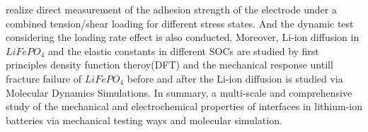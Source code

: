\begin{eabstract}
realize direct measurement of the adhesion strength of the
electrode under a combined tension/shear loading for different
stress states. And the dynamic test considering the loading rate effect is also conducted. Moreover, Li-ion diffusion in $LiFePO_4$ and the elastic constants in different SOCs are studied by first principles density function theroy(DFT) and the mechanical response untill fracture failure of $LiFePO_4$ before and after the Li-ion diffusion is studied via Molecular Dynamics Simulations. In summary, a multi-scale and comprehensive study of the mechanical and electrochemical properties of interfaces in lithium-ion batteries via mechanical testing ways and molecular simulation.
\end{eabstract}

